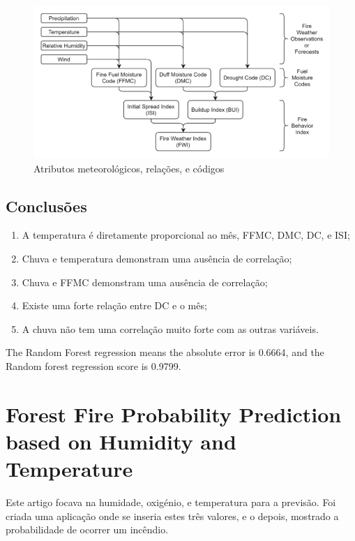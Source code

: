 \documentclass{article}
\begin{document}
\begin{figure}[H]
 \centering
  \includegraphics[width=0.70\linewidth]{imgs/fwi_structure.png}
   \caption{\label{fig:fwi_structure}Atributos meteorológicos, relações, e códigos}
\end{figure}


\subsection{Conclusões}
\begin{enumerate}
    \item A temperatura é diretamente proporcional ao mês, FFMC, DMC, DC, e ISI;
    \item Chuva e temperatura demonstram uma ausência de correlação;
    \item Chuva e FFMC demonstram uma ausência de correlação;
    \item Existe uma forte relação entre DC e o mês;
    \item A chuva não tem uma correlação muito forte com as outras variáveis.
\end{enumerate}

The Random Forest regression means the absolute error 
is 0.6664, and the Random forest regression score is 0.9799.



\section{Forest Fire Probability Prediction based on Humidity and Temperature \cite{10085661}}
Este artigo focava na humidade, oxigénio, e temperatura para a previsão. Foi criada uma aplicação onde se inseria estes três valores, e o depois, mostrado a probabilidade de ocorrer um incêndio.   
\end{document}
